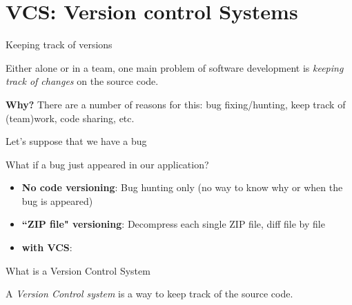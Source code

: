 
\section{VCS: Version control Systems}

\begin{frame}[fragile]{Keeping track of versions}

Either alone or in a team, one main problem of software development is \textit{keeping
track of changes} on the source code.

\vspace{1em}

\textbf{Why?} There are a number of reasons for this: bug fixing/hunting, keep
track of (team)work, code sharing, etc.

\end{frame}

\begin{frame}[fragile]{Let's suppose that we have a bug}

What if a bug just appeared in our application?

\begin{itemize}
  \item \textbf{No code versioning}: Bug hunting only (no way to know why or when the bug is appeared)
  \item \textbf{``ZIP file" versioning}: Decompress each single ZIP file, diff file by file
  \item \textbf{with VCS}: 
\end{itemize}

\end{frame}

\begin{frame}[fragile]{What is a Version Control System}

A \textit{Version Control system} is a way to keep track of the source code.

\end{frame}
